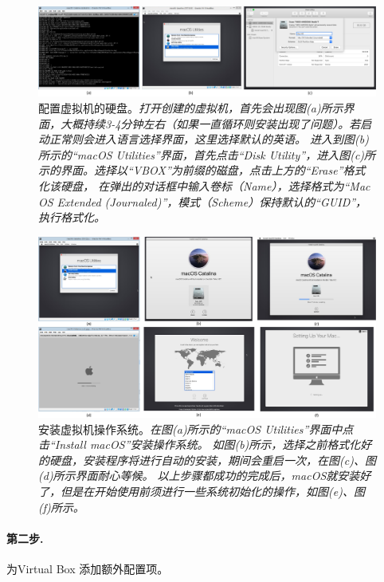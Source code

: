 \documentclass[final]{cvpr}
\newcommand{\mypara}[1]{\paragraph{#1.}}
\begin{document}
\begin{figure}[t]
  \centering
  \includegraphics[width=\textwidth]{install1.pdf}
  \caption{配置虚拟机的硬盘。\textit{打开创建的虚拟机，首先会出现图(a)所示界面，大概持续3-4分钟左右（如果一直循环则安装出现了问题）。若启动正常则会进入语言选择界面，这里选择默认的英语。
  进入到图(b)所示的“macOS Utilities”界面，首先点击“Disk Utility”，进入图(c)所示的界面。选择以“VBOX”为前缀的磁盘，点击上方的“Erase”格式化该硬盘，
  在弹出的对话框中输入卷标（Name），选择格式为“Mac OS Extended (Journaled)”，模式（Scheme）保持默认的“GUID”，执行格式化。}}\label{fig:install1}
\end{figure}

\begin{figure}[t]
  \centering
  \includegraphics[width=\textwidth]{install2.pdf}
  \caption{安装虚拟机操作系统。\textit{在图(a)所示的“macOS Utilities”界面中点击“Install macOS”安装操作系统。
  如图(b)所示，选择之前格式化好的硬盘，安装程序将进行自动的安装，期间会重启一次，在图(c)、图(d)所示界面耐心等候。
  以上步骤都成功的完成后，macOS就安装好了，但是在开始使用前须进行一些系统初始化的操作，如图(e)、图(f)所示。}}\label{fig:install2}
\end{figure}


\mypara{第二步} 为Virtual Box 添加额外配置项。
\end{document}

